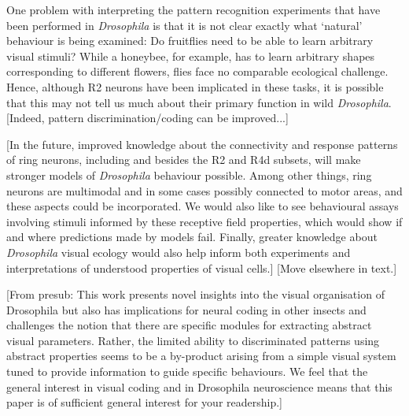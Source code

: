 One problem with interpreting the pattern recognition experiments that have been performed in \emph{Drosophila} is that it is not clear exactly what `natural' behaviour is being examined:
Do fruitflies need to be able to learn arbitrary visual stimuli?
While a honeybee, for example, has to learn arbitrary shapes corresponding to different flowers, flies face no comparable ecological challenge.
Hence, although R2 neurons have been implicated in these tasks, it is possible that this may not tell us much about their primary function in wild \emph{Drosophila}.
[Indeed, pattern discrimination/coding can be improved...]

[In the future, improved knowledge about the connectivity and response patterns of ring neurons, including and besides the R2 and R4d subsets, will make stronger models of \emph{Drosophila} behaviour possible.
Among other things, ring neurons are multimodal and in some cases possibly connected to motor areas, and these aspects could be incorporated.
We would also like to see behavioural assays involving stimuli informed by these receptive field properties, which would show if and where predictions made by models fail.
Finally, greater knowledge about \emph{Drosophila} visual ecology would also help inform both experiments and interpretations of understood properties of visual cells.] [Move elsewhere in text.]

[From presub: This work presents novel insights into the visual organisation of Drosophila but also has implications for neural coding in other insects and challenges the notion that there are specific modules for extracting abstract visual parameters. Rather, the limited ability to discriminated patterns using abstract properties seems to be a by-product arising from a simple visual system tuned to provide information to guide specific behaviours. We feel that the general interest in visual coding and in Drosophila neuroscience means that this paper is of sufficient general interest for your readership.]